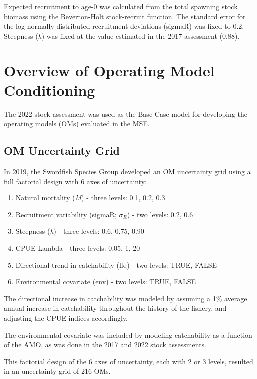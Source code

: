 \documentclass[
]{article}
\begin{document}
Expected recruitment to age-0 was calculated from the total spawning stock biomass using the Beverton-Holt stock-recruit function. The standard error for the log-normally distributed recruitment deviations (sigmaR) was fixed to 0.2. Steepness (\emph{h}) was fixed at the value estimated in the 2017 assessment (0.88).

\hypertarget{om-conditioning}{%
\section{Overview of Operating Model Conditioning}\label{om-conditioning}}

The 2022 stock assessment was used as the Base Case model for developing the operating models (OMs) evaluated in the MSE.

\hypertarget{om-uncertainty-grid}{%
\subsection{OM Uncertainty Grid}\label{om-uncertainty-grid}}

In 2019, the Swordfish Species Group developed an OM uncertainty grid using a full factorial design with 6 axes of uncertainty:

\begin{enumerate}
\def\labelenumi{\arabic{enumi}.}
\item
  Natural mortality (\emph{M}) - three levels: 0.1, 0.2, 0.3
\item
  Recruitment variability (sigmaR; \(\sigma_R\)) - two levels: 0.2, 0.6
\item
  Steepness (\emph{h}) - three levels: 0.6, 0.75, 0.90
\item
  CPUE Lambda - three levels: 0.05, 1, 20
\item
  Directional trend in catchability (llq) - two levels: TRUE, FALSE
\item
  Environmental covariate (env) - two levels: TRUE, FALSE
\end{enumerate}

The directional increase in catchability was modeled by assuming a 1\% average annual increase in catchability throughout the history of the fishery, and adjusting the CPUE indices accordingly.

The environmental covariate was included by modeling catchability as a function of the AMO, as was done in the 2017 and 2022 stock assessments.

This factorial design of the 6 axes of uncertainty, each with 2 or 3 levels, resulted in an uncertainty grid of 216 OMs.
\end{document}
